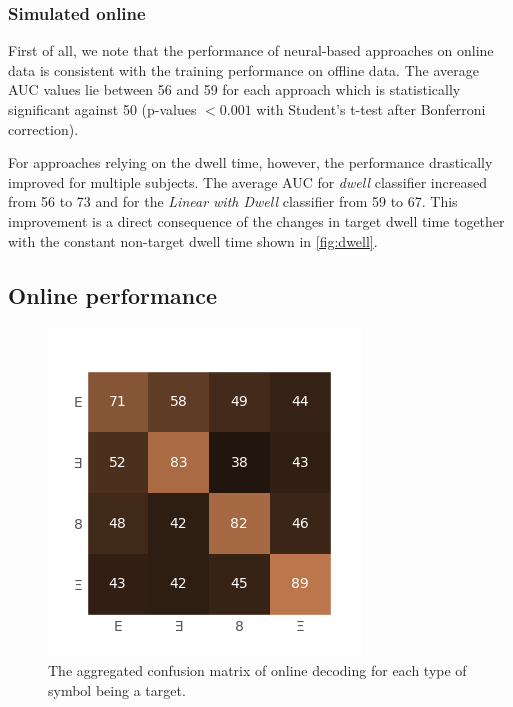 \documentclass[12pt]{iopart}
\begin{document}
\subsubsection*{Simulated online}
First of all, we note that the performance of neural-based approaches 
on online data is consistent with the training performance on offline data.
The average AUC values lie between 56 and 59 for each approach
which is statistically significant against 50
(p-values $< 0.001$ with Student's t-test after Bonferroni correction).

For approaches relying on the dwell time, however, the performance drastically improved
for multiple subjects. The average AUC for \textit{dwell} classifier increased
from 56 to 73 and for the \textit{Linear with Dwell} classifier from 59 to 67.
This improvement is a direct consequence of the changes in target dwell time
together with the constant non-target dwell time shown in \ref{fig:dwell}.


\subsection{Online performance}

\begin{figure}[!t]
    \includegraphics[trim={0cm 0cm 0cm 0cm},clip,width=0.5\columnwidth]{../images/OnlineConfusion.png}
    \caption{The aggregated confusion matrix of online decoding for each type of symbol being
    a target.}
\label{fig:onlineconf}
\end{figure}
\end{document}
